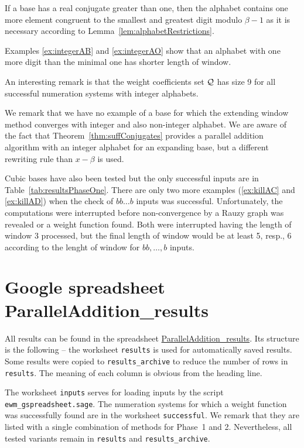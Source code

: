 If a base has a real conjugate greater than one, then the alphabet contains one more element congruent to the smallest and greatest digit modulo $\beta-1$ as it is necessary according to Lemma~\ref{lem:alphabetRestrictions}.

Examples \ref{ex:integerAB} and \ref{ex:integerAO} show that  an alphabet with one more digit than the minimal one has shorter length of window.

An interesting remark is that the weight coefficients set $\mathcal{Q}$ has size 9 for all successful numeration systems with integer alphabets.

We remark that we have no example of a base for which the extending window method converges with integer and also non-integer alphabet. We are aware of the fact that Theorem~\ref{thm:suffConjugates} provides a parallel addition algorithm with an integer alphabet for an expanding base, but  a different rewriting rule than $x-\beta$ is used.



Cubic bases have also been tested but the only successful inputs are in Table~\ref{tab:resultsPhaseOne}. There are only two more examples (\ref{ex:killAC} and \ref{ex:killAD}) when the check of $bb\dots b$ inputs was successful. Unfortunately, the computations were interrupted before non-convergence by a Rauzy graph was revealed or a weight function found. Both were interrupted having the length of window 3 processed, but the final length of window would be at least 5, resp., 6 according to the lenght of window for $bb,\dots,b$ inputs.








\section{Google spreadsheet ParallelAddition\_results}
\label{sec:gspreadsheet}
All results can be found in the spreadsheet \href{https://docs.google.com/spreadsheets/d/1TnhrHdefHfHa0WSeVs4q6XVj3epjPlPlnoekE0E1xeM/edit?usp=sharing}{ParallelAddition\_results}. Its structure is the following -- the worksheet \verb+results+ is used for automatically saved results. Some results were copied to \verb+results_archive+ to reduce the number of rows in \verb+results+. The meaning of each column is obvious from the heading line. 

The worksheet \verb+inputs+ serves for loading inputs by the script \verb+ewm_gspreadsheet.sage+. The numeration systems for which a weight function was successfully found are in the worksheet \verb+successful+. We remark that they are listed with a single combination of methods for Phase~1 and 2. Nevertheless, all tested variants remain in \verb+results+ and \verb+results_archive+. 


